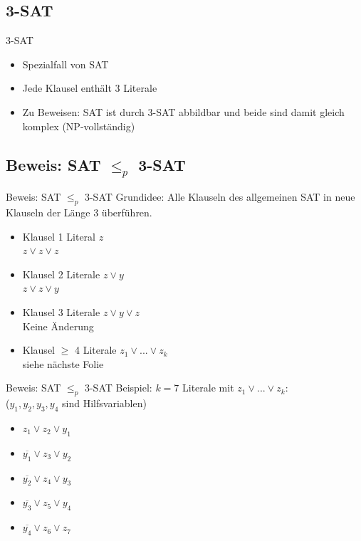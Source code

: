 \documentclass[12pt,handout,notes=dontshow,xcolor=table]{beamer}
\begin{document}
\subsection{3-SAT}
\begin{frame}{3-SAT}
\begin{itemize}
\item Spezialfall von SAT
\item Jede Klausel enthält 3 Literale
\item Zu Beweisen: SAT ist durch 3-SAT abbildbar und beide sind damit gleich komplex (NP-vollständig)
\end{itemize}
\end{frame}

\subsection{Beweis: SAT $\leq_p$ 3-SAT}
\begin{frame}{Beweis: SAT \(\leq_p\) 3-SAT}
Grundidee: Alle Klauseln des allgemeinen SAT in neue Klauseln der Länge 3 überführen.
\begin{itemize}
\item Klausel 1 Literal  \(z\) \\ \textrightarrow \(z \vee z \vee z\)
\item Klausel 2 Literale \(z \vee y\) \\ \textrightarrow \(z \vee z \vee y\)
\item Klausel 3 Literale \(z \vee y \vee z\) \\ \textrightarrow Keine Änderung
\item Klausel \(\ge\) 4 Literale \(z_1 \vee ... \vee z_k\) \\ \textrightarrow siehe nächste Folie
\end{itemize}
\end{frame}

\begin{frame}{Beweis: SAT \(\leq_p\) 3-SAT}
Beispiel: \(k = 7\) Literale mit \(z_1 \vee ... \vee z_k\):\\
(\(y_1,y_2,y_3,y_4\) sind Hilfsvariablen)
\begin{itemize}
\item \(z_1 \vee z_2 \vee y_1\)
\item \(\overline{y_1} \vee z_3 \vee y_2\)
\item \(\overline{y_2} \vee z_4 \vee y_3\)
\item \(\overline{y_3} \vee z_5 \vee y_4\)
\item \(\overline{y_4} \vee z_6 \vee z_7\)\\
\end{itemize}
\end{frame}
\end{document}
